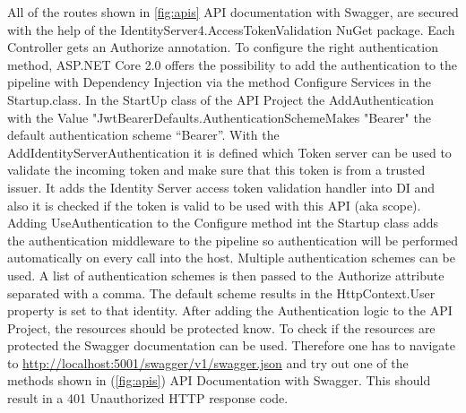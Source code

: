 All of the routes shown in \ref{fig:apis} API documentation with Swagger, are secured with the help of the IdentityServer4.AccessTokenValidation NuGet package. Each Controller gets an Authorize annotation. 
To configure the right authentication method, ASP.NET Core 2.0 offers the possibility to add the authentication to the pipeline with Dependency Injection via the method Configure Services in the Startup.class.
In the StartUp class of the API Project the AddAuthentication with the Value "JwtBearerDefaults.AuthenticationSchemeMakes "Bearer" the default authentication scheme “Bearer”. With the AddIdentityServerAuthentication it is defined which Token server can be used to validate the incoming token and make sure that this token is from a trusted issuer. It adds the Identity Server access token validation handler into DI and also it is checked if the token is valid to be used with this API (aka scope). Adding UseAuthentication to the Configure method int the Startup class adds the authentication middleware to the pipeline so authentication will be performed automatically on every call into the host.  Multiple authentication schemes can be used. A list of authentication schemes is then passed to the Authorize attribute separated with a comma. The default scheme results in the HttpContext.User property is set to that identity. After adding the Authentication logic to the API Project, the resources should be protected know. To check if the resources are protected the Swagger documentation can be used. Therefore one has to navigate to \url{http://localhost:5001/swagger/v1/swagger.json} and try out one of the methods shown in (\ref{fig:apis}) API Documentation with Swagger. This should result in a 401 Unauthorized HTTP response code.



